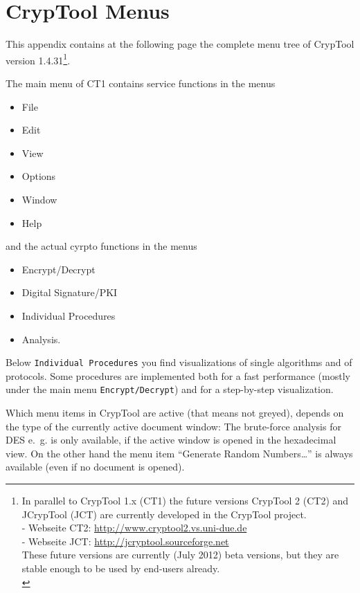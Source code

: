 
\newpage
\enlargethispage{1cm}
\hypertarget{appendix-menutree}{}
\section{CrypTool Menus}
\label{s:appendix-menutree}

This appendix contains at the following page the complete menu tree of
CrypTool version 1.4.31\footnote{%
  In parallel to CrypTool 1.x (CT1) the future versions
  CrypTool 2 (CT2) and JCrypTool (JCT)
  are currently developed in the CrypTool project.\\
  - Webseite CT2: \url{http://www.cryptool2.vs.uni-due.de} \\
  - Webseite JCT: \url{http://jcryptool.sourceforge.net} \\
  These future versions are currently (July 2012) beta versions, but they
  are stable enough to be used by end-users already.\\
}. 

\noindent The main menu of CT1 contains service functions in the menus
\begin{itemize}
   \item File
   \item Edit
   \item View
   \item Options
   \item Window
   \item Help
\end{itemize}
and the actual cyrpto functions in the menus
\begin{itemize}
   \item Encrypt/Decrypt
   \item Digital Signature/PKI
   \item Individual Procedures
   \item Analysis.
\end{itemize}

Below \verb#Individual Procedures# you find visualizations of single algorithms
and of protocols. Some procedures are implemented both for a fast performance
(mostly under the main menu \verb#Encrypt/Decrypt#) and for a step-by-step visualization.

Which menu items in CrypTool are active (that means not greyed), depends on
the type of the currently active document window:
The brute-force analysis for DES e.~g. is only
available, if the active window is opened in the hexadecimal view. 
On the other hand the menu item ``Generate Random Numbers\dots''
is always available (even if no document is opened).

